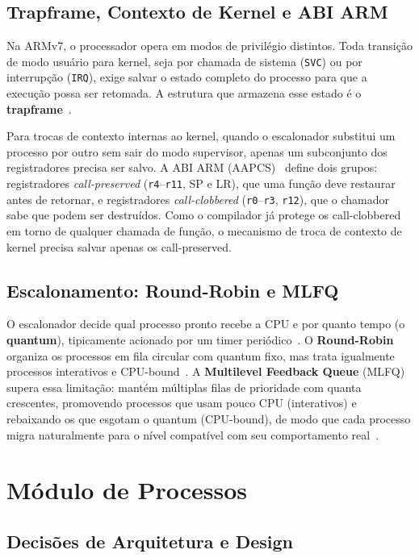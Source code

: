 \subsection{Trapframe, Contexto de Kernel e ABI ARM}

Na ARMv7, o processador opera em modos de privilégio distintos. Toda transição
de modo usuário para kernel, seja por chamada de sistema (\texttt{SVC}) ou por
interrupção (\texttt{IRQ}), exige salvar o estado completo do processo para que
a execução possa ser retomada. A estrutura que armazena
esse estado é o \textbf{trapframe}~\cite{tanenbaum2015}.

Para trocas de contexto internas ao kernel, quando o escalonador substitui
um processo por outro sem sair do modo supervisor, apenas um subconjunto
dos registradores precisa ser salvo. A ABI ARM (AAPCS)~\cite{arm:armv7ar} define
dois grupos: registradores \emph{call-preserved} (\texttt{r4}--\texttt{r11}, SP e LR), que uma
função deve restaurar antes de retornar, e registradores \emph{call-clobbered}
(\texttt{r0}--\texttt{r3}, \texttt{r12}), que o chamador sabe que podem ser destruídos. Como o compilador
já protege os call-clobbered em torno de qualquer chamada de função, o
mecanismo de troca de contexto de kernel precisa salvar apenas os call-preserved.

\subsection{Escalonamento: Round-Robin e MLFQ}

O escalonador decide qual processo pronto recebe a CPU e por quanto tempo
(o \textbf{quantum}), tipicamente acionado por um timer periódico~\cite{silberschatz2018}.
O \textbf{Round-Robin} organiza os processos em fila circular com quantum fixo,
mas trata igualmente processos interativos e CPU-bound~\cite{tanenbaum2015}.
A \textbf{Multilevel Feedback Queue} (MLFQ) supera essa limitação: mantém
múltiplas filas de prioridade com quanta crescentes, promovendo processos que
usam pouco CPU (interativos) e rebaixando os que esgotam o quantum (CPU-bound),
de modo que cada processo migra naturalmente para o nível compatível com seu
comportamento real~\cite{silberschatz2018}.


\section{Módulo de Processos}


\subsection{Decisões de Arquitetura e Design}


